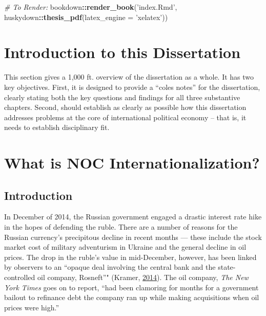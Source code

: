 \documentclass [11pt, proquest] {uwthesis}[2015/03/03]
\newenvironment{Shaded}{}{}
\newcommand{\KeywordTok}[1]{\textcolor[rgb]{0.00,0.44,0.13}{\textbf{{#1}}}}
\newcommand{\DataTypeTok}[1]{\textcolor[rgb]{0.56,0.13,0.00}{{#1}}}
\newcommand{\StringTok}[1]{\textcolor[rgb]{0.25,0.44,0.63}{{#1}}}
\newcommand{\CommentTok}[1]{\textcolor[rgb]{0.38,0.63,0.69}{\textit{{#1}}}}
\newcommand{\NormalTok}[1]{{#1}}
\newcommand{\OperatorTok}[1]{\textcolor[rgb]{0.00,0.44,0.13}{\textbf{{#1}}}}
\begin{document}
\begin{Shaded}
\begin{Highlighting}[]
\CommentTok{# To Render:}
\NormalTok{bookdown}\OperatorTok{::}\KeywordTok{render_book}\NormalTok{(}\StringTok{'index.Rmd'}\NormalTok{, huskydown}\OperatorTok{::}\KeywordTok{thesis_pdf}\NormalTok{(}\DataTypeTok{latex_engine =} \StringTok{'xelatex'}\NormalTok{))}
\end{Highlighting}
\end{Shaded}
\hypertarget{introduction-to-this-dissertation}{%
\chapter*{Introduction to this Dissertation}\label{introduction-to-this-dissertation}}

This section gives a 1,000 ft. overview of the dissertation as a whole. It has two key objectives. First, it is designed to provide a ``coles notes'' for the dissertation, clearly stating both the key questions and findings for all three substantive chapters. Second, should establish as clearly as possible how this dissertation addresses problems at the core of international political economy -- that is, it needs to establish disciplinary fit.

\hypertarget{paper1}{%
\chapter{What is NOC Internationalization?}\label{paper1}}

\hypertarget{intro01}{%
\section{Introduction}\label{intro01}}

In December of 2014, the Russian government engaged a drastic interest rate hike in the hopes of defending the ruble. There are a number of reasons for the Russian currency's precipitous decline in recent months --- these include the stock market cost of military adventurism in Ukraine and the general decline in oil prices. The drop in the ruble's value in mid-December, however, has been linked by observers to an ``opaque deal involving the central bank and the state-controlled oil company, Rosneft''" (Kramer, \protect\hyperlink{ref-kramer_russias_2014}{2014}). The oil company, \emph{The New York Times} goes on to report, ``had been clamoring for months for a government bailout to refinance debt the company ran up while making acquisitions when oil prices were high.''
\end{document}
